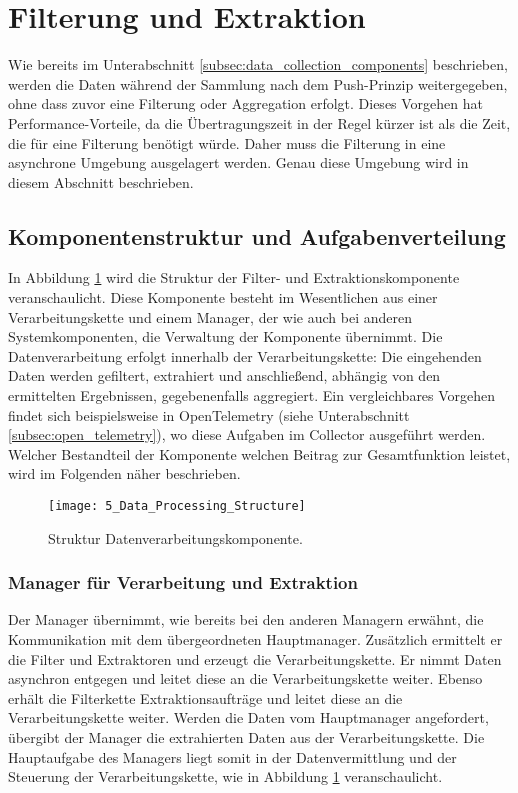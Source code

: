 \section{Filterung und Extraktion}
\label{sec:data_extraction_concept}
Wie bereits im Unterabschnitt \ref{subsec:data_collection_components} beschrieben, werden die Daten während der Sammlung nach dem Push-Prinzip weitergegeben, ohne dass zuvor eine Filterung oder Aggregation erfolgt. Dieses Vorgehen hat Performance-Vorteile, da die Übertragungszeit in der Regel kürzer ist als die Zeit, die für eine Filterung benötigt würde. Daher muss die Filterung in eine asynchrone Umgebung ausgelagert werden. Genau diese Umgebung wird in diesem Abschnitt beschrieben.

\subsection{Komponentenstruktur und Aufgabenverteilung}
In Abbildung \ref{fig:structure_data_processing} wird die Struktur der Filter- und Extraktionskomponente veranschaulicht.
Diese Komponente besteht im Wesentlichen aus einer Verarbeitungskette und einem Manager, der wie auch bei anderen Systemkomponenten, die Verwaltung der Komponente übernimmt. Die Datenverarbeitung erfolgt innerhalb der Verarbeitungskette: Die eingehenden Daten werden gefiltert, extrahiert und anschließend, abhängig von den ermittelten Ergebnissen, gegebenenfalls aggregiert. Ein vergleichbares Vorgehen findet sich beispielsweise in OpenTelemetry (siehe Unterabschnitt \ref{subsec:open_telemetry}), wo diese Aufgaben im Collector ausgeführt werden. Welcher Bestandteil der Komponente welchen Beitrag zur Gesamtfunktion leistet, wird im Folgenden näher beschrieben.

\begin{figure}[H]
\centering
\texttt{[image: 5\_Data\_Processing\_Structure]}
\caption{Struktur Datenverarbeitungskomponente.}
\label{fig:structure_data_processing}
\end{figure}

\subsubsection{Manager für Verarbeitung und Extraktion}
Der Manager übernimmt, wie bereits bei den anderen Managern erwähnt, die Kommunikation mit dem übergeordneten Hauptmanager. Zusätzlich ermittelt er die Filter und Extraktoren und erzeugt die Verarbeitungskette. Er nimmt Daten asynchron entgegen und leitet diese an die Verarbeitungskette weiter. Ebenso erhält die Filterkette Extraktionsaufträge und leitet diese an die Verarbeitungskette weiter. Werden die Daten vom Hauptmanager angefordert, übergibt der Manager die extrahierten Daten aus der Verarbeitungskette. Die Hauptaufgabe des Managers liegt somit in der Datenvermittlung und der Steuerung der Verarbeitungskette, wie in Abbildung \ref{fig:structure_data_processing} veranschaulicht.

